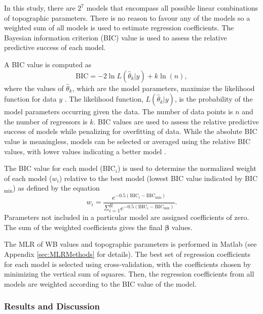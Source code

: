 \documentclass{sfuthesis}
\begin{document}
{In this study, there are $2^7$ models that encompass all possible linear combinations of topographic parameters. There is no reason to favour any of the models so a weighted sum of all models is used to estimate regression coefficients.   The Bayesian information criterion (BIC) value is used to assess the relative predictive success of each model. 

A BIC value is computed as
\begin{equation}
\textrm{BIC} = -2 \ln L(\hat\theta_k  | y) + k \ln(n),
\end{equation}
where the values of $\hat \theta_k$, which are the model parameters, maximize the likelihood function for data $y$ \citep{Burnham2004}. The likelihood function, $ L(\hat\theta_k  | y)$, is the probability of the model parameters occurring given the data. The number of data points is $n$ and the number of regressors is $k$. BIC values are used to assess the relative predictive success of models while penalizing for overfitting of data. While the absolute BIC value is meaningless, models can be selected or averaged using the relative BIC values, with lower values indicating a better model \citep{Burnham2004}. 

The BIC value for each model (BIC$_i$) is used to determine the normalized weight of each model ($w_i$) relative to the best model (lowest BIC value indicated by BIC$_{\min}$) as defined by the equation \citep{Burnham2004}
\begin{equation}
w_i = \frac{e^{-0.5(\mathrm{BIC}_i-\mathrm{BIC}_{\min})}}{\Sigma_{i=1}^R e^{-0.5(\mathrm{BIC}_i-\mathrm{BIC}_{\min})}}.
\label{eq:BIC}
\end{equation}
Parameters not included in a particular model are assigned coefficients of zero. The sum of the weighted coefficients gives the final $\bm{\beta}$ values.

The MLR of WB values and topographic parameters is performed in Matlab (see Appendix \ref{sec:MLRMethods} for details). The best set of regression coefficients for each model is selected using cross-validation, with the coefficients chosen by minimizing the vertical sum of squares. Then, the regression coefficients from all models are weighted according to the BIC value of the model.

\subsubsection{Results and Discussion}

}
\end{document}
